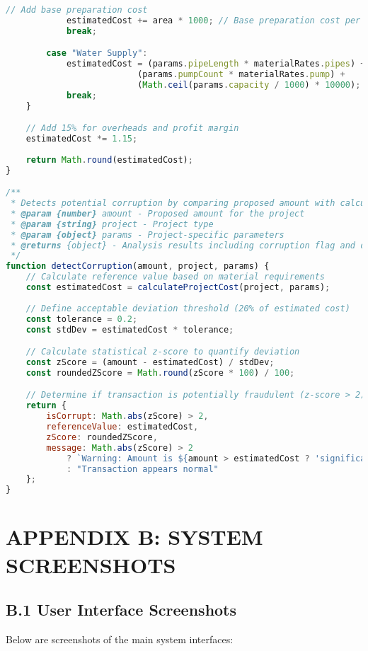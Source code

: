 \documentclass[12pt,a4paper]{report}
\begin{document}
\begin{lstlisting}[language=JavaScript]
            // Add base preparation cost
            estimatedCost += area * 1000; // Base preparation cost per sq meter
            break;

        case "Water Supply":
            estimatedCost = (params.pipeLength * materialRates.pipes) +
                          (params.pumpCount * materialRates.pump) +
                          (Math.ceil(params.capacity / 1000) * 10000); // Storage tank cost
            break;
    }

    // Add 15% for overheads and profit margin
    estimatedCost *= 1.15;
    
    return Math.round(estimatedCost);
}

/**
 * Detects potential corruption by comparing proposed amount with calculated reference value
 * @param {number} amount - Proposed amount for the project
 * @param {string} project - Project type
 * @param {object} params - Project-specific parameters
 * @returns {object} - Analysis results including corruption flag and deviation metrics
 */
function detectCorruption(amount, project, params) {
    // Calculate reference value based on material requirements
    const estimatedCost = calculateProjectCost(project, params);
    
    // Define acceptable deviation threshold (20% of estimated cost)
    const tolerance = 0.2;
    const stdDev = estimatedCost * tolerance;

    // Calculate statistical z-score to quantify deviation
    const zScore = (amount - estimatedCost) / stdDev;
    const roundedZScore = Math.round(zScore * 100) / 100;

    // Determine if transaction is potentially fraudulent (z-score > 2)
    return {
        isCorrupt: Math.abs(zScore) > 2,
        referenceValue: estimatedCost,
        zScore: roundedZScore,
        message: Math.abs(zScore) > 2 
            ? `Warning: Amount is ${amount > estimatedCost ? 'significantly higher' : 'significantly lower'} than estimated cost!`
            : "Transaction appears normal"
    };
}
\end{lstlisting}



\chapter{APPENDIX B: SYSTEM SCREENSHOTS}

\section*{B.1 User Interface Screenshots}
\indent \indent Below are screenshots of the main system interfaces:
\end{document}

